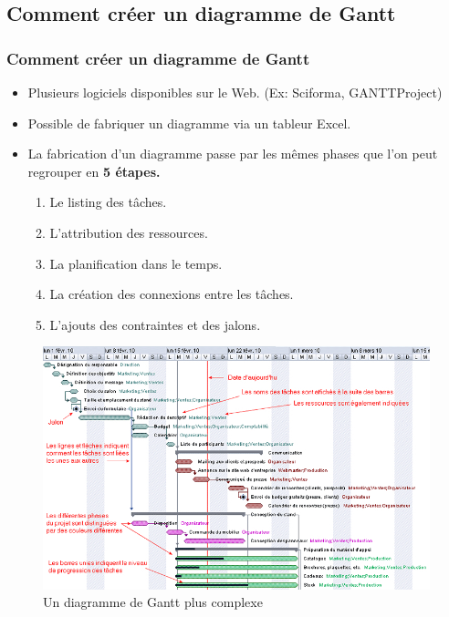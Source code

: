 \documentclass{beamer}
\begin{document}
\subsection{Comment créer un diagramme de Gantt}

\begin{frame}
  \frametitle{Comment créer un diagramme de Gantt}
  \begin{itemize}
  \item Plusieurs logiciels disponibles sur le Web. (Ex: Sciforma, GANTTProject)
  \item \alert{Possible de fabriquer un diagramme via un tableur Excel.}
  \item La fabrication d'un diagramme passe par les mêmes phases que l'on peut regrouper en \textbf{5 étapes.}
    \begin{enumerate}[<+-| alert@+>]
    \item Le listing des tâches.
    \item L'attribution des ressources.
    \item La planification dans le temps.
    \item La création des connexions entre les tâches.
    \item L'ajouts des contraintes et des jalons.
    \end{enumerate}
    
  \end{itemize}
\end{frame}


\begin{frame}
  \begin{figure}
    \centering
    \includegraphics[width=1\textwidth]{Cgantt}
    \caption{Un diagramme de Gantt plus complexe}
  \end{figure}
\end{frame}
\end{document}
